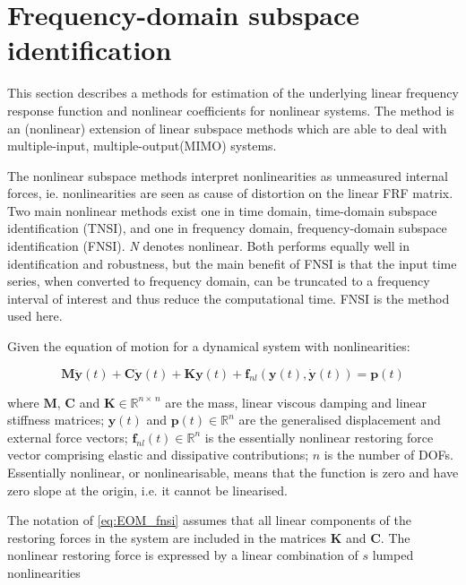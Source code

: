\section{Frequency-domain subspace identification}
\label{sec:freq-doma-subsp}

This section describes a methods for estimation of the underlying linear
frequency response function and nonlinear coefficients for nonlinear systems.
The method is an (nonlinear) extension of linear subspace methods which are able
to deal with multiple-input, multiple-output(MIMO) systems.

The nonlinear subspace methods interpret nonlinearities as unmeasured internal
forces, ie. nonlinearities are seen as cause of distortion on the linear FRF
matrix. Two main nonlinear methods exist one in time domain, time-domain
subspace identification (TNSI)\autocite{marchesiello2008a}, and one in frequency
domain, frequency-domain subspace identification (FNSI)\autocite{noel2013a}.
\textit{N} denotes nonlinear.
Both performs equally well in identification and robustness, but the main
benefit of FNSI is that the input time series, when converted to frequency
domain, can be truncated to a frequency interval of interest and thus reduce the
computational time. FNSI is the method used here.


Given the equation of motion for a dynamical system with nonlinearities:

\begin{equation}
  \label{eq:EOM_fnsi}
  \bm M \ddot{\bm y}(t) + \bm C \dot{\bm y}(t) + \bm K \bm y(t) +
  \bm f_{nl} \left( \bm y(t), \dot{ \bm y}(t) \right) = \bm p (t)
\end{equation}

where $\bm M$, $\bm C$ and $\bm K \in \mathbb{R}^{n \times \, n}$ are the mass,
linear viscous damping and linear stiffness matrices; $\bm y(t)$ and $\bm p(t)
\in \mathbb{R}^{n}$ are the generalised displacement and external force vectors;
$\bm f_{nl}(t) \in \mathbb{R}^{n}$ is the essentially nonlinear restoring force
vector comprising elastic and dissipative contributions; $n$ is the number of
DOFs. Essentially nonlinear, or nonlinearisable, means that the function is zero
and have zero slope at the origin, i.e. it cannot be linearised.


The notation of \eqref{eq:EOM_fnsi} assumes that all linear components of the
restoring forces in the system are included in the matrices $\bm K$ and $\bm
C$. The nonlinear restoring force is expressed by a linear combination of $s$
lumped nonlinearities

